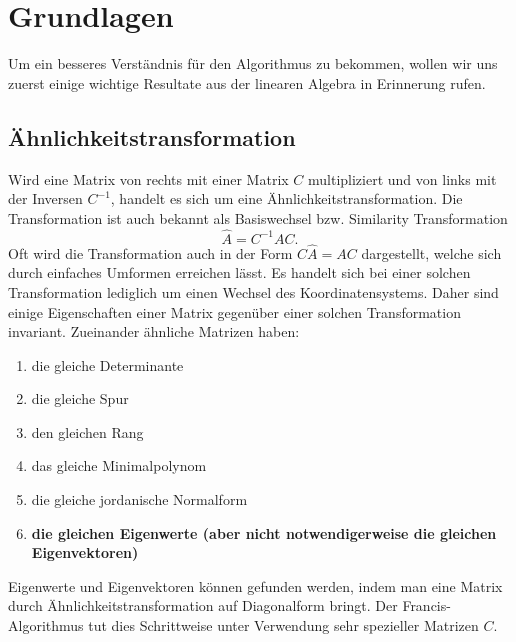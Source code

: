 \section{Grundlagen\label{francis:section:grundlagen}}
Um ein besseres Verständnis für den Algorithmus zu bekommen, wollen wir uns zuerst einige wichtige Resultate aus der linearen Algebra in Erinnerung rufen.

\subsection{Ähnlichkeitstransformation\label{francis:section:grundlagen:aehnlichkeitstransform}}
Wird eine Matrix von rechts mit einer Matrix $C$ multipliziert und von links mit der Inversen $C^{-1}$, handelt es sich um eine Ähnlichkeitstransformation. Die Transformation ist auch bekannt als Basiswechsel bzw. Similarity Transformation
\begin{equation}
	\hat{A}=C^{-1}AC.
\end{equation}
Oft wird die Transformation auch in der Form $C\hat{A}=AC$ dargestellt, welche sich durch einfaches Umformen erreichen lässt.
Es handelt sich bei einer solchen Transformation lediglich um einen Wechsel des Koordinatensystems.
Daher sind einige Eigenschaften einer Matrix gegenüber einer solchen Transformation invariant.
Zueinander ähnliche Matrizen haben:
\begin{enumerate}
	\item die gleiche Determinante
	\item die gleiche Spur
	\item den gleichen Rang
	\item das gleiche Minimalpolynom
	\item die gleiche jordanische Normalform
	\item \textbf{die gleichen Eigenwerte (aber nicht notwendigerweise die gleichen Eigenvektoren)}
\end{enumerate}

Eigenwerte und Eigenvektoren können gefunden werden, indem man eine Matrix durch Ähnlichkeitstransformation auf Diagonalform bringt.
Der Francis-Algorithmus tut dies Schrittweise unter Verwendung sehr spezieller Matrizen $C$.


